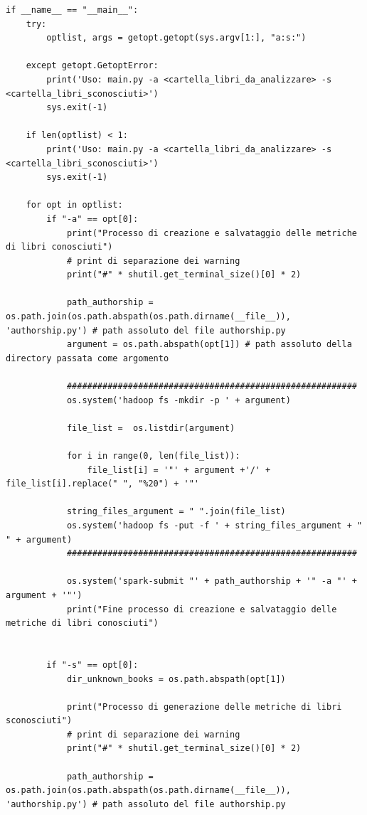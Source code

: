 \documentclass[titlepage]{article}
\begin{document}
\begin{verbatim}
if __name__ == "__main__":
    try:
        optlist, args = getopt.getopt(sys.argv[1:], "a:s:")
    
    except getopt.GetoptError:
        print('Uso: main.py -a <cartella_libri_da_analizzare> -s <cartella_libri_sconosciuti>')
        sys.exit(-1)
        
    if len(optlist) < 1:
        print('Uso: main.py -a <cartella_libri_da_analizzare> -s <cartella_libri_sconosciuti>')
        sys.exit(-1)

    for opt in optlist:
        if "-a" == opt[0]:
            print("Processo di creazione e salvataggio delle metriche di libri conosciuti")
            # print di separazione dei warning
            print("#" * shutil.get_terminal_size()[0] * 2)

            path_authorship = os.path.join(os.path.abspath(os.path.dirname(__file__)), 'authorship.py') # path assoluto del file authorship.py
            argument = os.path.abspath(opt[1]) # path assoluto della directory passata come argomento
            
            #########################################################
            os.system('hadoop fs -mkdir -p ' + argument)
            
            file_list =  os.listdir(argument)
            
            for i in range(0, len(file_list)):
                file_list[i] = '"' + argument +'/' + file_list[i].replace(" ", "%20") + '"'
            
            string_files_argument = " ".join(file_list)         
            os.system('hadoop fs -put -f ' + string_files_argument + " " + argument)
            #########################################################
            
            os.system('spark-submit "' + path_authorship + '" -a "' + argument + '"')
            print("Fine processo di creazione e salvataggio delle metriche di libri conosciuti")
            
            
        if "-s" == opt[0]:
            dir_unknown_books = os.path.abspath(opt[1])
            
            print("Processo di generazione delle metriche di libri sconosciuti")
            # print di separazione dei warning
            print("#" * shutil.get_terminal_size()[0] * 2)
            
            path_authorship = os.path.join(os.path.abspath(os.path.dirname(__file__)), 'authorship.py') # path assoluto del file authorship.py
            

\end{verbatim}
\end{document}
